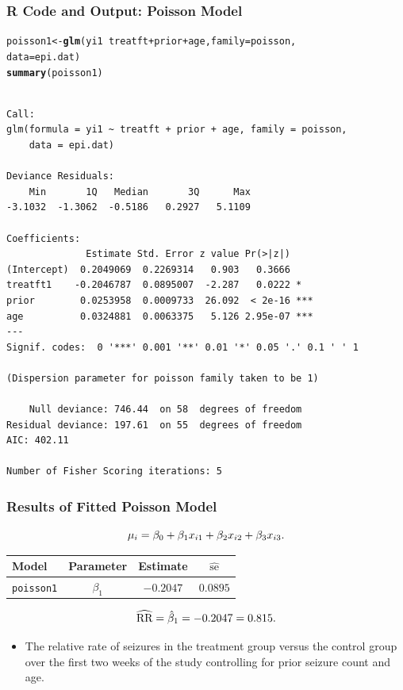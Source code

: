 \documentclass[oneside]{book}\usepackage[]{graphicx}\usepackage[svgnames]{xcolor}
\makeatletter
\newcommand{\hlopt}[1]{\textcolor[rgb]{0,0,0}{#1}}%
\newcommand{\hlstd}[1]{\textcolor[rgb]{0.345,0.345,0.345}{#1}}%
\newcommand{\hlkwb}[1]{\textcolor[rgb]{0.69,0.353,0.396}{#1}}%
\newcommand{\hlkwc}[1]{\textcolor[rgb]{0.333,0.667,0.333}{#1}}%
\newcommand{\hlkwd}[1]{\textcolor[rgb]{0.737,0.353,0.396}{\textbf{#1}}}%
\newenvironment{kframe}{%
 \def\at@end@of@kframe{}%
 \ifinner\ifhmode%
  \def\at@end@of@kframe{\end{minipage}}%
  \begin{minipage}{\columnwidth}%
 \fi\fi%
 \def\FrameCommand##1{\hskip\@totalleftmargin \hskip-\fboxsep
 \colorbox{shadecolor}{##1}\hskip-\fboxsep
     \hskip-\linewidth \hskip-\@totalleftmargin \hskip\columnwidth}%
 \MakeFramed {\advance\hsize-\width
   \@totalleftmargin\z@ \linewidth\hsize
   \@setminipage}}%
 {\par\unskip\endMakeFramed%
 \at@end@of@kframe}
\newenvironment{knitrout}{}{} %
\let\exp\relax%
\let\log\relax%
\newcommand{\RR}{\text{RR}}%
\makeatother
\begin{document}
\subsubsection*{R Code and Output: Poisson Model}
\begin{knitrout}
\color{fgcolor}\begin{kframe}
\begin{alltt}
\hlstd{poisson1} \hlkwb{<-} \hlkwd{glm}\hlstd{(yi1} \hlopt{~} \hlstd{treatft} \hlopt{+} \hlstd{prior} \hlopt{+} \hlstd{age,} \hlkwc{family} \hlstd{= poisson,}
  \hlkwc{data} \hlstd{= epi.dat)}
\hlkwd{summary}\hlstd{(poisson1)}
\end{alltt}
\begin{verbatim}

Call:
glm(formula = yi1 ~ treatft + prior + age, family = poisson, 
    data = epi.dat)

Deviance Residuals: 
    Min       1Q   Median       3Q      Max  
-3.1032  -1.3062  -0.5186   0.2927   5.1109  

Coefficients:
              Estimate Std. Error z value Pr(>|z|)    
(Intercept)  0.2049069  0.2269314   0.903   0.3666    
treatft1    -0.2046787  0.0895007  -2.287   0.0222 *  
prior        0.0253958  0.0009733  26.092  < 2e-16 ***
age          0.0324881  0.0063375   5.126 2.95e-07 ***
---
Signif. codes:  0 '***' 0.001 '**' 0.01 '*' 0.05 '.' 0.1 ' ' 1

(Dispersion parameter for poisson family taken to be 1)

    Null deviance: 746.44  on 58  degrees of freedom
Residual deviance: 197.61  on 55  degrees of freedom
AIC: 402.11

Number of Fisher Scoring iterations: 5
\end{verbatim}
\end{kframe}
\end{knitrout}
\subsubsection*{Results of Fitted Poisson Model}
\[ \log{\mu_i}=\beta_0+\beta_1x_{i1}+\beta_2x_{i2}+\beta_3x_{i3}. \]
\begin{table}[H]
    \centering
    \begin{tabular}{lccc}
        Model             & Parameter   & Estimate    & $ \widehat{\text{se}} $ \\
        \midrule
        \texttt{poisson1} & $ \beta_1 $ & $ -0.2047 $ & $ 0.0895 $              \\
        \bottomrule
    \end{tabular}
\end{table}
\[ \widehat{\RR}=\exp{\hat{\beta}_1}=\exp{-0.2047}=0.815. \]
\begin{itemize}
    \item The relative rate of seizures in the treatment group versus the control group over
          the first two weeks of the study controlling for prior seizure count and age.
\end{itemize}
\end{document}
